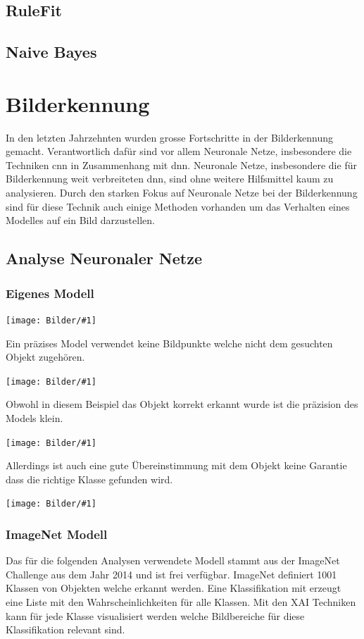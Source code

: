 \documentclass[
  12pt, %
  a4paper, %
  oneside, %
  openany, 
  numbers=noenddot, %
  BCOR=5mm, %
  parskip=half*, %
  thesis, %
]{bfhbook}
\newcommand{\imgText}[2]{
\begin{center}
    \begin{minipage}[t]{0.6\textwidth}
    		\vspace{0pt}
		\texttt{[image: Bilder/\#1]}
	\end{minipage}\hfill
    \begin{minipage}[t]{0.4\textwidth}
    		\vspace{0pt}
  		#2
    \end{minipage}
\end{center}
}
\begin{document}
\subsection{RuleFit}
\subsection{Naive Bayes}

\section{Bilderkennung}
In den letzten Jahrzehnten wurden grosse Fortschritte in der Bilderkennung gemacht. Verantwortlich dafür sind vor allem Neuronale Netze, insbesondere die Techniken \acrfull{cnn} in Zusammenhang mit {dnn}. Neuronale Netze, insbesondere die für Bilderkennung weit verbreiteten \acrfull{dnn}, sind ohne weitere Hilfsmittel kaum zu analysieren.
Durch den starken Fokus auf Neuronale Netze bei der Bilderkennung sind für diese Technik auch einige Methoden vorhanden um das Verhalten eines Modelles  auf ein Bild darzustellen.
\subsection{Analyse Neuronaler Netze}
\subsubsection*{Eigenes Modell}
\imgText{dog-good-heatmap.png}{ 
Ein präzises Model verwendet keine Bildpunkte welche nicht dem gesuchten Objekt zugehören.
}

\imgText{dog-bad-heatmap.png}{ 
Obwohl in diesem Beispiel das Objekt korrekt erkannt wurde ist die präzision des Models klein.
}

\imgText{cat-good-heatmap.png}{ 
Allerdings ist auch eine gute Übereinstimmung mit dem Objekt keine Garantie dass die richtige Klasse gefunden wird.
}

\imgText{cat-bad-heatmap.png}{ 

}
\subsubsection*{ImageNet Modell}
Das für die folgenden Analysen verwendete Modell \parencite{Simonyan2014} stammt aus der ImageNet Challenge \cite{imageNet} aus dem Jahr 2014 und ist frei verfügbar. ImageNet definiert 1001 Klassen von Objekten welche erkannt werden. Eine Klassifikation mit \cite{TensorFlow} erzeugt eine Liste mit den Wahrscheinlichkeiten für alle Klassen. Mit den \acrfull{XAI} Techniken kann für jede Klasse visualisiert werden welche Bildbereiche für diese Klassifikation relevant sind.
\end{document}
